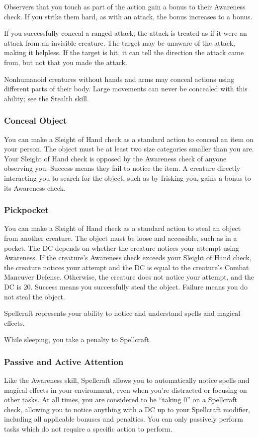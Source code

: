 Observers that you touch as part of the action gain a  bonus to their Awareness check. If you strike them hard, as with an attack, the bonus increases to a  bonus.

If you successfully conceal a ranged attack, the attack is treated as if it were an attack from an invisible creature. The target may be unaware of the attack, making it helpless. If the target is hit, it can tell the direction the attack came from, but not that you made the attack.

Nonhumanoid creatures without hands and arms may conceal actions using different parts of their body. Large movements can never be concealed with this ability; see the Stealth skill.

\subsubsection{Conceal Object}
You can make a Sleight of Hand check as a standard action to conceal an item on your person. The object must be at least two size categories smaller than you are. Your Sleight of Hand check is opposed by the Awareness check of anyone observing you. Success means they fail to notice the item. A creature directly interacting you to search for the object, such as by frisking you, gains a  bonus to its Awareness check.

\subsubsection{Pickpocket}
You can make a Sleight of Hand check as a standard action to steal an object from another creature. The object must be loose and accessible, such as in a pocket. The DC depends on whether the creature notices your attempt using Awareness. If the creature's Awareness check exceeds your Sleight of Hand check, the creature notices your attempt and the DC is equal to the creature's Combat Maneuver Defense. Otherwise, the creature does not notice your attempt, and the DC is 20. Success means you successfully steal the object. Failure means you do not steal the object.

Spellcraft represents your ability to notice and understand spells and magical effects.

While sleeping, you take a  penalty to Spellcraft.

\subsubsection{Passive and Active Attention}\label{Spellcraft-Passive and Active Attention}
Like the Awareness skill, Spellcraft allows you to automatically notice spells and magical effects in your environment, even when you're distracted or focusing on other tasks. At all times, you are considered to be ``taking 0'' on a Spellcraft check, allowing you to notice anything with a DC up to your Spellcraft modifier, including all applicable bonuses and penalties. You can only passively perform tasks which do not require a specific action to perform.

